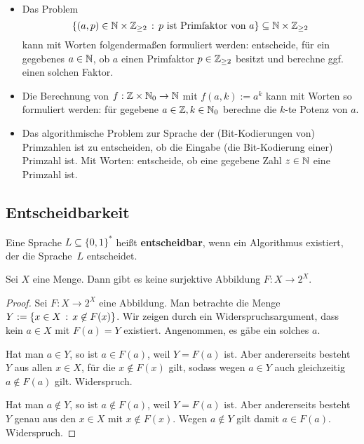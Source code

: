\begin{bsp}\ 
	\begin{itemize} 
		\item Das Problem
		\[
		\left\{  (a,p) \in \mathbb{N} \times \mathbb{Z}_{\ge 2}  \,:\, p \ \text{ist Primfaktor von} \ a \right\} \subseteq \mathbb{N} \times \mathbb{Z}_{\ge 2}
		\]
		kann mit Worten folgendermaßen formuliert werden: entscheide, für ein gegebenes $a \in \mathbb{N}$, ob $a$ einen Primfaktor $p \in \mathbb{Z}_{\ge 2}$ besitzt und berechne ggf. einen solchen Faktor. 
		\item Die Berechnung von $f : \mathbb{Z} \times \mathbb{N}_0 \to \mathbb{N}$ mit $f(a,k):= a^k$ kann mit Worten so formuliert werden: für gegebene $a \in \mathbb{Z},k \in \mathbb{N}_0$ berechne die $k$-te Potenz von $a$. 
		\item Das algorithmische  Problem zur Sprache der (Bit-Kodierungen von) Primzahlen ist zu entscheiden, ob die Eingabe (die Bit-Kodierung einer) Primzahl ist. Mit Worten: entscheide, ob eine gegebene Zahl $z \in \mathbb{N}$ eine Primzahl ist. 
	\end{itemize} 
\end{bsp} 

\subsection{Entscheidbarkeit}

\begin{defn}
	Eine Sprache $L \subseteq \{0,1\}^\ast$ heißt \textbf{entscheidbar}, wenn ein Algorithmus existiert, der die Sprache~$L$ entscheidet. 
\end{defn} 

\begin{lem} \label{lem:X:2^X}
	Sei $X$ eine Menge. Dann gibt es keine surjektive Abbildung $F : X \to 2^X$. 
\end{lem}
\begin{proof}
Sei $F : X \to 2^X$ eine Abbildung.
	Man betrachte die Menge $Y := \left\{ x \in X \,:\, x \not\in F(x) \right\}$. Wir zeigen durch ein Widerspruchsargument, dass kein $a \in X$ mit $F(a) =Y$ existiert. Angenommen, es gäbe ein solches $a$. 
	
	Hat man $a \in Y$, so ist $a \in F(a)$, weil $Y=F(a)$ ist. Aber andererseits besteht $Y$ aus allen $x \in X$, für die $x \not\in F(x)$ gilt, sodass wegen $a \in Y$ auch gleichzeitig $a \not\in F(a)$ gilt. Widerspruch. 
	
	Hat man $a \not\in Y$, so ist $a \not\in F(a)$, weil $Y=F(a)$ ist. Aber andererseits besteht $Y$ genau aus den $x \in X$ mit $x \not\in F(x)$. Wegen $a \not\in Y$ gilt damit $a \in F(a)$. Widerspruch. 
\end{proof} 


